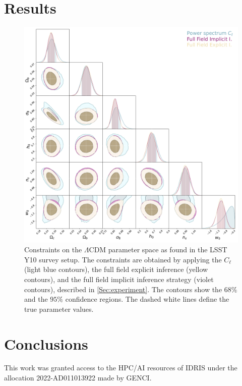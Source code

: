 \documentclass{aa}
\begin{document}
\section{Results}\label{Sec:results}
\begin{figure}
    \centering
\includegraphics[width=\textwidth]{figures/contours_posterior_imp_ex_ps.pdf}
    \caption{
Constraints on the $\Lambda$CDM parameter space as found in the LSST Y10 survey setup. The constraints are obtained by applying the $C_{\ell}$ (light blue contours), the full field explicit inference (yellow contours), and the full field implicit inference strategy (violet contours), described in \autoref{Sec:experiment}.
The contours show the $68\%$ and the $95\%$  confidence regions. The dashed white lines define the true parameter values.}
\label{fig:contours_posterior_imp_ex_ps}
\end{figure}
\section{Conclusions}
\begin{acknowledgements}
This work was granted access to the HPC/AI resources of IDRIS under the allocation 2022-AD011013922 made by GENCI.
\end{acknowledgements}

 
\end{document}
